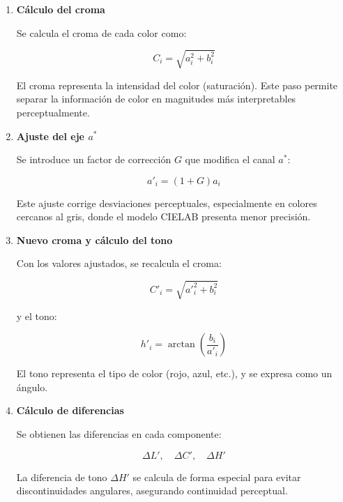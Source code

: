 \documentclass[a4paper]{article}
\begin{document}
\begin{enumerate}
	
	\item \textbf{Cálculo del croma}
	
	Se calcula el croma de cada color como:
	
	\begin{equation}
		C_i = \sqrt{a_i^2 + b_i^2}
	\end{equation}
	
	El croma representa la intensidad del color (saturación). Este paso permite separar la información de color en magnitudes más interpretables perceptualmente.
	
	\item \textbf{Ajuste del eje $a^*$}
	
	Se introduce un factor de corrección $G$ que modifica el canal $a^*$:
	
	\begin{equation}
		a'_i = (1 + G)a_i
	\end{equation}
	
	Este ajuste corrige desviaciones perceptuales, especialmente en colores cercanos al gris, donde el modelo CIELAB presenta menor precisión.
	
	\item \textbf{Nuevo croma y cálculo del tono}
	
	Con los valores ajustados, se recalcula el croma:
	
	\begin{equation}
		C'_i = \sqrt{a'^2_i + b_i^2}
	\end{equation}
	
	y el tono:
	
	\begin{equation}
		h'_i = \arctan\left(\frac{b_i}{a'_i}\right)
	\end{equation}
	
	El tono representa el tipo de color (rojo, azul, etc.), y se expresa como un ángulo.
	
	\item \textbf{Cálculo de diferencias}
	
	Se obtienen las diferencias en cada componente:
	
	\begin{equation}
		\Delta L', \quad \Delta C', \quad \Delta H'
	\end{equation}
	
	La diferencia de tono $\Delta H'$ se calcula de forma especial para evitar discontinuidades angulares, asegurando continuidad perceptual.
	

\end{enumerate}
\end{document}

